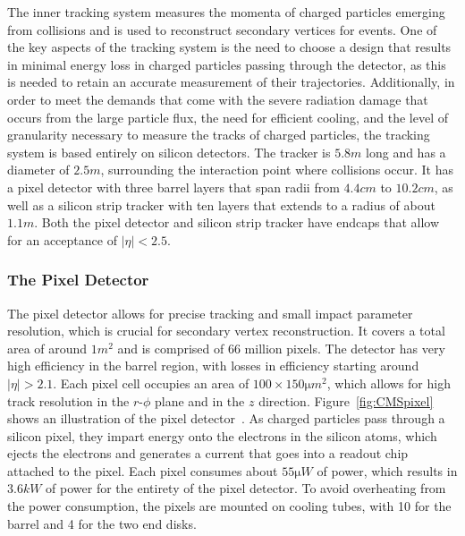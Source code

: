 The inner tracking system measures the momenta of charged particles emerging from collisions and is used to reconstruct secondary vertices for events.
One of the key aspects of the tracking system is the need to choose a design that results in minimal energy loss in charged particles passing through the detector, as this is needed to retain an accurate measurement of their trajectories. %
Additionally, in order to meet the demands that come with the severe radiation damage that occurs from the large particle flux, the need for efficient cooling, and the level of granularity necessary to measure the tracks of charged particles, the tracking system is based entirely on silicon detectors.
The tracker is $5.8\unit{m}$ long and has a diameter of $2.5\unit{m}$, surrounding the interaction point where collisions occur.
It has a pixel detector with three barrel layers that span radii from $4.4\unit{cm}$ to $10.2\unit{cm}$, as well as a silicon strip tracker with ten layers that extends to a radius of about $1.1\unit{m}$.
Both the pixel detector and silicon strip tracker have endcaps that allow for an acceptance of $|\eta|<2.5$.

\subsubsection{The Pixel Detector}

The pixel detector allows for precise tracking and small impact parameter resolution, which is crucial for secondary vertex reconstruction.
It covers a total area of around $1\unit{m^2}$ and is comprised of 66 million pixels.
The detector has very high efficiency in the barrel region, with losses in efficiency starting around $|\eta|>2.1$. %
Each pixel cell occupies an area of $100\times150\unit{\micro m^2}$, which allows for high track resolution in the $r$-$\phi$ plane and in the $z$ direction.
Figure~\ref{fig:CMSpixel} shows an illustration of the pixel detector~\cite{Collaboration_2010_pixel}.
As charged particles pass through a silicon pixel, they impart energy onto the electrons in the silicon atoms, which ejects the electrons and generates a current that goes into a readout chip attached to the pixel.
Each pixel consumes about $55\unit{\micro W}$ of power, which results in $3.6\unit{kW}$ of power for the entirety of the pixel detector.
To avoid overheating from the power consumption, the pixels are mounted on cooling tubes, with 10 for the barrel and 4 for the two end disks.

